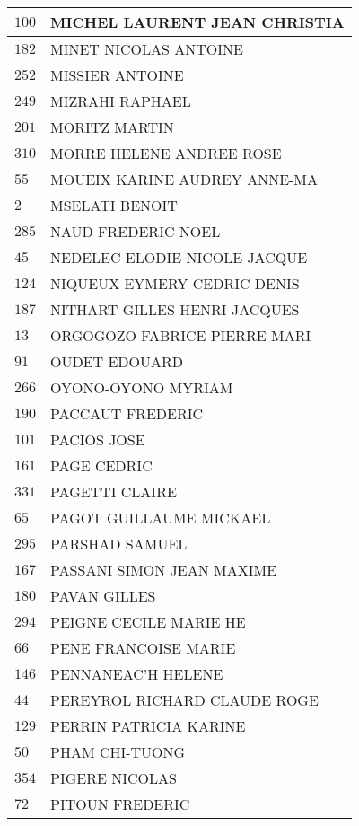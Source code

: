 \begin{xltabular}{\linewidth}{|l|X|}
    \hline
    $100$ & MICHEL LAURENT JEAN CHRISTIA \\
    \hline
    $182$ & MINET NICOLAS ANTOINE \\
    \hline
    $252$ & MISSIER ANTOINE \\
    \hline
    $249$ & MIZRAHI RAPHAEL \\
    \hline
    $201$ & MORITZ MARTIN \\
    \hline
    $310$ & MORRE HELENE ANDREE ROSE \\
    \hline
    $55$ & MOUEIX KARINE AUDREY ANNE-MA \\
    \hline
    $2$ & MSELATI BENOIT \\
    \hline
    $285$ & NAUD FREDERIC NOEL \\
    \hline
    $45$ & NEDELEC ELODIE NICOLE JACQUE \\
    \hline
    $124$ & NIQUEUX-EYMERY CEDRIC DENIS \\
    \hline
    $187$ & NITHART GILLES HENRI JACQUES \\
    \hline
    $13$ & ORGOGOZO FABRICE PIERRE MARI \\
    \hline
    $91$ & OUDET EDOUARD \\
    \hline
    $266$ & OYONO-OYONO MYRIAM \\
    \hline
    $190$ & PACCAUT FREDERIC \\
    \hline
    $101$ & PACIOS JOSE \\
    \hline
    $161$ & PAGE CEDRIC \\
    \hline
    $331$ & PAGETTI CLAIRE \\
    \hline
    $65$ & PAGOT GUILLAUME MICKAEL \\
    \hline
    $295$ & PARSHAD SAMUEL \\
    \hline
    $167$ & PASSANI SIMON JEAN MAXIME \\
    \hline
    $180$ & PAVAN GILLES \\
    \hline
    $294$ & PEIGNE CECILE MARIE HE \\
    \hline
    $66$ & PENE FRANCOISE MARIE \\
    \hline
    $146$ & PENNANEAC'H HELENE \\
    \hline
    $44$ & PEREYROL RICHARD CLAUDE ROGE \\
    \hline
    $129$ & PERRIN PATRICIA KARINE \\
    \hline
    $50$ & PHAM CHI-TUONG \\
    \hline
    $354$ & PIGERE NICOLAS \\
    \hline
    $72$ & PITOUN FREDERIC \\

\end{xltabular}
